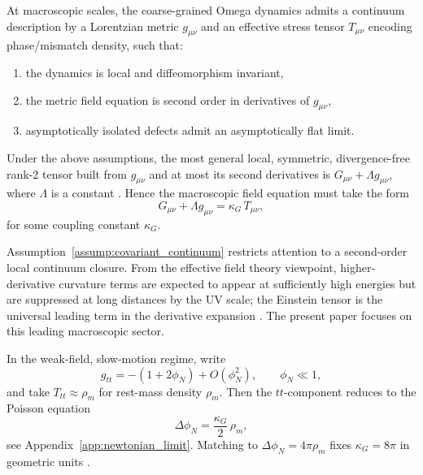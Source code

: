\begin{assumption}
\label{assump:covariant_continuum}
At macroscopic scales, the coarse-grained Omega dynamics admits a continuum description by a Lorentzian metric $g_{\mu\nu}$ and an effective stress tensor $T_{\mu\nu}$ encoding phase/mismatch density, such that:
\begin{enumerate}
  \item the dynamics is local and diffeomorphism invariant,
  \item the metric field equation is second order in derivatives of $g_{\mu\nu}$,
  \item asymptotically isolated defects admit an asymptotically flat limit.
\end{enumerate}
\end{assumption}

\begin{theorem}
Under the above assumptions, the most general local, symmetric, divergence-free rank-2 tensor built from $g_{\mu\nu}$ and at most its second derivatives is $G_{\mu\nu}+\Lambda g_{\mu\nu}$, where $\Lambda$ is a constant \cite{Lovelock1971}. Hence the macroscopic field equation must take the form
\begin{equation}
  G_{\mu\nu} + \Lambda g_{\mu\nu} = \kappa_G\, T_{\mu\nu},
\end{equation}
for some coupling constant $\kappa_G$.
\end{theorem}

\begin{remark}
Assumption~\ref{assump:covariant_continuum} restricts attention to a second-order local continuum closure. From the effective field theory viewpoint, higher-derivative curvature terms are expected to appear at sufficiently high energies but are suppressed at long distances by the UV scale; the Einstein tensor is the universal leading term in the derivative expansion \cite{Donoghue1994}. The present paper focuses on this leading macroscopic sector.
\end{remark}

\begin{proposition}
In the weak-field, slow-motion regime, write
\begin{equation}
  g_{tt}=-(1+2\phi_N)+O(\phi_N^2),\qquad \phi_N\ll 1,
\end{equation}
and take $T_{tt}\approx \rho_m$ for rest-mass density $\rho_m$. Then the $tt$-component reduces to the Poisson equation
\begin{equation}
  \Delta \phi_N = \frac{\kappa_G}{2}\,\rho_m ,
\end{equation}
see Appendix~\ref{app:newtonian_limit}. Matching to $\Delta \phi_N = 4\pi \rho_m$ fixes $\kappa_G=8\pi$ in geometric units \cite{Wald1984}.
\end{proposition}

